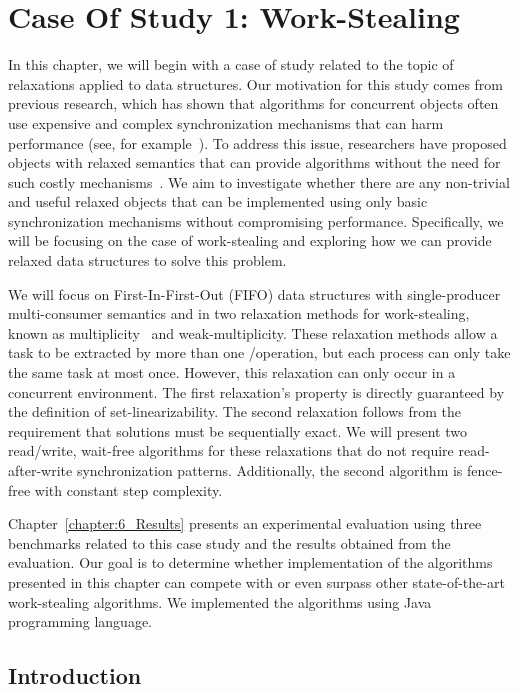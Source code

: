 \chapter{\label{chapter:4_work-stealing}Case Of Study 1: Work-Stealing}

In this chapter, we will begin with a case of study related to the topic of relaxations applied to data structures. Our motivation for this study comes from previous research, which has shown that algorithms for concurrent objects often use expensive and complex synchronization mechanisms that can harm performance (see, for example~\cite{DBLP_conf_popl_AttiyaGHKMV11,DBLP_journals_toplas_Herlihy91}). To address this issue, researchers have proposed objects with relaxed semantics that can provide algorithms without the need for such costly mechanisms~\cite{maged.vechev.2009,fencefreework}. We aim to investigate whether there are any non-trivial and useful relaxed objects that can be implemented using only basic synchronization mechanisms without compromising performance. Specifically, we will be focusing on the case of work-stealing and exploring how we can provide relaxed data structures to solve this problem.

We will focus on First-In-First-Out (FIFO) data structures with single-producer multi-consumer semantics and in two relaxation methods for work-stealing, known as multiplicity~\cite{DBLP_journals_dc_CastanedaRR23} and weak-multiplicity. These relaxation methods allow a task to be extracted by more than one \Take/\Steal operation, but each process can only take the same task at most once. However, this relaxation can only occur in a concurrent environment. The first relaxation's property is directly guaranteed by the definition of set-linearizability. The second relaxation follows from the requirement that solutions must be sequentially exact. We will present two read/write, wait-free algorithms for these relaxations that do not require read-after-write synchronization patterns. Additionally, the second algorithm is fence-free with constant step complexity.

Chapter~\ref{chapter:6_Results} presents an experimental evaluation using three benchmarks related to this case study and the results obtained from the evaluation. Our goal is to determine whether implementation of the algorithms presented in this chapter can compete with or even surpass other state-of-the-art work-stealing algorithms. We implemented the algorithms using Java programming language.

\section{Introduction}

